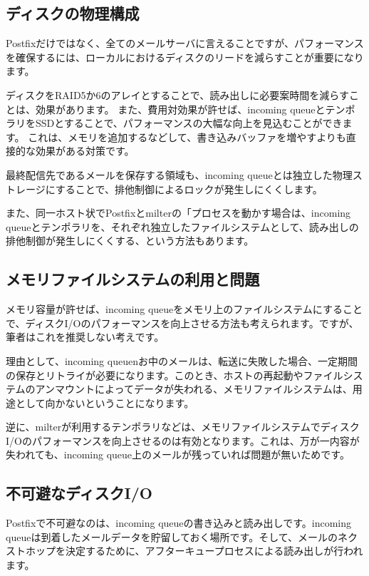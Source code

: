 \subsection{ディスクの物理構成}

Postfixだけではなく、全てのメールサーバに言えることですが、パフォーマンスを確保するには、ローカルにおけるディスクのリードを減らすことが重要になります。

ディスクをRAID5か6のアレイとすることで、読み出しに必要案時間を減らすことは、効果があります。
また、費用対効果が許せば、incoming queueとテンポラリをSSDとすることで、パフォーマンスの大幅な向上を見込むことができます。
これは、メモリを追加するなどして、書き込みバッファを増やすよりも直接的な効果がある対策です。

最終配信先であるメールを保存する領域も、incoming queueとは独立した物理ストレージにすることで、排他制御によるロックが発生しにくくします。

また、同一ホスト状でPostfixとmilterの「プロセスを動かす場合は、incoming queueとテンポラリを、それぞれ独立したファイルシステムとして、読み出しの排他制御が発生しにくくする、という方法もあります。


\subsection{メモリファイルシステムの利用と問題}

メモリ容量が許せば、incoming queueをメモリ上のファイルシステムにすることで、ディスクI/Oのパフォーマンスを向上させる方法も考えられます。ですが、筆者はこれを推奨しない考えです。

理由として、incoming queuenお中のメールは、転送に失敗した場合、一定期間の保存とリトライが必要になります。このとき、ホストの再起動やファイルシステムのアンマウントによってデータが失われる、メモリファイルシステムは、用途として向かないということになります。

逆に、milterが利用するテンポラリなどは、メモリファイルシステムでディスクI/Oのパフォーマンスを向上させるのは有効となります。これは、万が一内容が失われても、incoming queue上のメールが残っていれば問題が無いためです。

\subsection{不可避なディスクI/O}

Postfixで不可避なのは、incoming queueの書き込みと読み出しです。incoming queueは到着したメールデータを貯留しておく場所です。そして、メールのネクストホップを決定するために、アフターキュープロセスによる読み出しが行われます。

